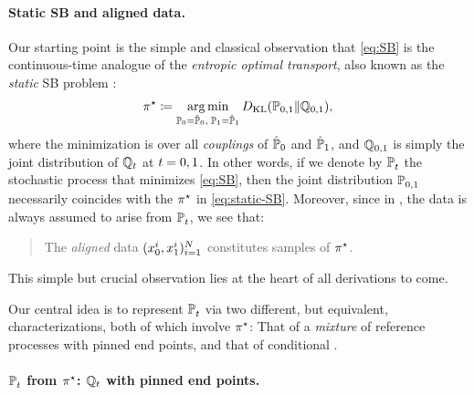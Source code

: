 \paragraph{Static SB and aligned data.}

Our starting point is the simple and classical observation that \eqref{eq:SB} is the continuous-time analogue of the \emph{entropic optimal transport}, also known as the \emph{static} \acrlong{SB} problem \citep{leonard2013survey,chen2021stochastic,peyre2019computational}:
\begin{equation}
\label{eq:static-SB}
\Pssol \defeq \argmin_{ \substack{ \Pinit = \distinit, \; \Pend = \distend} } \KL( \mathbb{P}_{0,1} \| \refprobase_{0,1}),
\end{equation}
where the minimization is over all \emph{couplings} of $\distinit$ and $\distend$, and $\refprobase_{0,1}$ is simply the joint distribution of $\refpro$ at $t=0,\horizon$. In other words, if we denote by $\Psol$ the stochastic process that minimizes \eqref{eq:SB}, then the joint distribution $\Psol[0,\horizon]$ necessarily coincides with the $\Pssol$ in \eqref{eq:static-SB}. Moreover, since in , the data is always assumed to arise from $\Psol$, we see that:
\begin{quote}
The \emph{aligned} data $(\x_0^i,\x_1^i)_{i=1}^N$ constitutes samples of $\Pssol$.
\end{quote}
This simple but crucial observation lies at the heart of all derivations to come. 

Our central idea is to represent $\Psol$ via two different, but equivalent, characterizations, both of which involve $\Pssol$: That of a \emph{mixture} of reference processes with pinned end points, and that of conditional .



\paragraph{$\Psol$ from $\Pssol$: $\refpro$ with pinned end points.}

